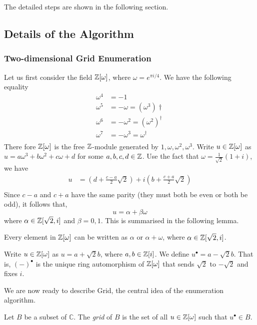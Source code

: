 The detailed steps are shown in the following section.

\subsection{Details of the Algorithm}

\subsubsection{Two-dimensional Grid Enumeration}

Let us first consider the field $\mathbb{Z}[\omega]$, where $\omega = e^{\pi i/4}$.
We have the following equality
\begin{align*}
	\omega^4 &= -1 \\ 
\omega^5 &= -\omega = (\omega^{3}) \dagger \\
\omega^6 &= -\omega^2 = (\omega^{2})^\dagger \\ 
	\omega^7 &= -\omega^3 = \omega^\dagger \\
\end{align*}
There fore $\mathbb{Z}[\omega]$ is the free $\mathbb{Z}$-module generated by $1, \omega, \omega^2, \omega^3$.
Write $u \in \mathbb{Z}[\omega]$ as $u = a \omega^3 + b \omega^2 + c \omega + d$ for some $a, b, c, d \in \mathbb{Z}$.
Use the fact that $\omega = \frac{1}{\sqrt{2}} (1 + i)$, we have
\begin{align*}
	u &= (d + \frac{c-a}{2} \sqrt{2}) +  i (b + \frac{c+a}{2} \sqrt{2}) \\
\end{align*}
Since $c-a$ and $c+a$ have the same parity (they must both be even or both be odd), it follows that,
$$
u = \alpha + \beta \omega
$$
where $\alpha \in \mathbb{Z}[\sqrt{2}, i]$ and $\beta = 0, 1$.
This is summarised in the following lemma. 
\begin{lemma}\label{z-omega-form}
	Every element in $\mathbb{Z}[\omega]$ can be written as $\alpha$ or $\alpha + \omega$, where $\alpha \in \mathbb{Z}[\sqrt{2}, i]$.
\end{lemma}

Write $u \in \mathbb{Z}[\omega]$ as $u = a + \sqrt{2} b$, where $a, b \in \mathbb{Z}[i]$.
We define $u^{\bullet} = a - \sqrt{2}b$. That is, $(-)^{\bullet}$ is the unique ring automorphism of $\mathbb{Z}[\omega]$ that sends $\sqrt{2}$ to $-\sqrt{2}$ and fixes $i$.

We are now ready to describe Grid, the central idea of the enumeration algorithm.

\begin{definition}[Grid]
	Let $B$ be a subset of $\mathbb{C}$. The \emph{grid} of $B$ is the set of all $u \in \mathbb{Z}[\omega]$ such that $u^{\bullet} \in B$.
\end{definition}


